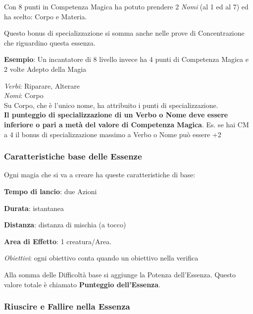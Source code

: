 \documentclass[a4paper,twoside,openany]{book}
\begin{document}
\begin{multicols}{2}
Con 8 punti in Competenza Magica ha potuto prendere 2 \textit{Nomi} (al 1 ed al 7) ed ha scelto: Corpo e Materia.

Questo bonus di specializzazione si somma anche nelle prove di Concentrazione che riguardino questa essenza.

\textbf{Esempio}: Un incantatore di 8 livello invece ha 4 punti di Competenza Magica e 2 volte Adepto della Magia

\textit{Verbi}: Riparare, Alterare\\
\textit{Nomi}: Corpo\\
Su Corpo, che è l'unico nome, ha attribuito i punti di specializzazione.\\

\textbf{Il punteggio di specializzazione di un Verbo o Nome deve essere inferiore o pari a metà del valore di Competenza Magica}. Es. se hai CM a 4 il bonus di specializzazione massimo a Verbo o Nome può essere +2

\subsubsection{Caratteristiche base delle Essenze}

\label{caratteristiche-base-delle-essenze}

Ogni magia che si va a creare ha queste caratteristiche di base:

\smallskip

\textbf{Tempo di lancio}: due Azioni

\textbf{Durata}: istantanea

\textbf{Distanza}: distanza di mischia (a tocco)

\textbf{Area di Effetto}: 1 creatura/Area.

\textit{Obiettivi}: ogni obiettivo conta quando un obiettivo nella verifica

Alla somma delle Difficoltà base si aggiunge la Potenza dell'Essenza. Questo valore totale è chiamato \textbf{Punteggio dell'Essenza}.

\subsubsection{Riuscire e Fallire nella Essenza}

\label{riuscire-e-fallire-nella-prova-di-magia}


\end{multicols}
\end{document}
